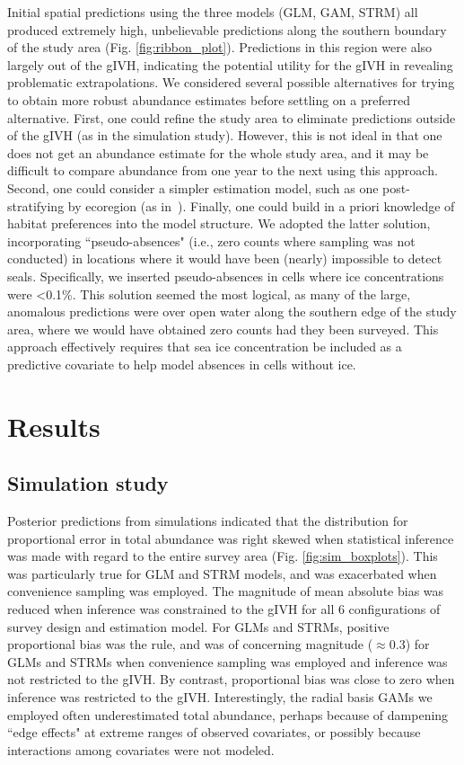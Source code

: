 \documentclass[10pt,letterpaper]{article}
\begin{document}
Initial spatial predictions using the three models (GLM, GAM, STRM) all produced extremely high, unbelievable predictions along the southern boundary of the study area (Fig. \ref{fig:ribbon_plot}).  Predictions in this region were also largely out of the gIVH, indicating the potential utility for the gIVH in revealing problematic extrapolations.
We considered several possible alternatives for trying to obtain more robust abundance estimates before settling on a preferred alternative.  First, one could refine the study area to eliminate predictions outside of the gIVH (as in the simulation study).  However, this is not ideal in that one does not get an abundance estimate for the whole study area, and it may be difficult to compare abundance from one year to the next using this approach. Second, one could consider a simpler estimation model, such as one post-stratifying by ecoregion (as in~\cite{ConnEtAl2014}).  Finally, one could build in a priori knowledge of habitat preferences into the model structure.  We adopted the latter solution, incorporating ``pseudo-absences" (i.e., zero counts where sampling was not conducted) in locations where it would have been (nearly) impossible to detect seals.  Specifically, we inserted pseudo-absences in cells where ice concentrations were \textless 0.1\%.  This solution seemed the most logical, as many of the large, anomalous predictions were over open water along the southern edge of the study area, where we would have obtained zero counts had they been surveyed.  This approach effectively requires that sea ice concentration be included as a predictive covariate to help model absences in cells without ice.


\section*{Results}

\subsection*{Simulation study}

Posterior predictions from simulations indicated that the distribution for proportional error in total abundance was right skewed when statistical inference was made with regard to the entire survey area (Fig. \ref{fig:sim_boxplots}).  This was particularly true for GLM and STRM models, and was exacerbated when convenience sampling was employed.  The magnitude of mean absolute bias was reduced when inference was constrained to the gIVH for all 6 configurations of survey design and estimation model.  For GLMs and STRMs, positive proportional bias was the rule, and was of concerning magnitude ($\approx 0.3$) for GLMs and STRMs when convenience sampling was employed and inference was not restricted to the gIVH.  By contrast, proportional bias was close to zero when inference was restricted to the gIVH.  Interestingly, the radial basis GAMs we employed often underestimated total abundance, perhaps because of dampening ``edge effects" at extreme ranges of observed covariates, or possibly because interactions among covariates were not modeled.
\end{document}
